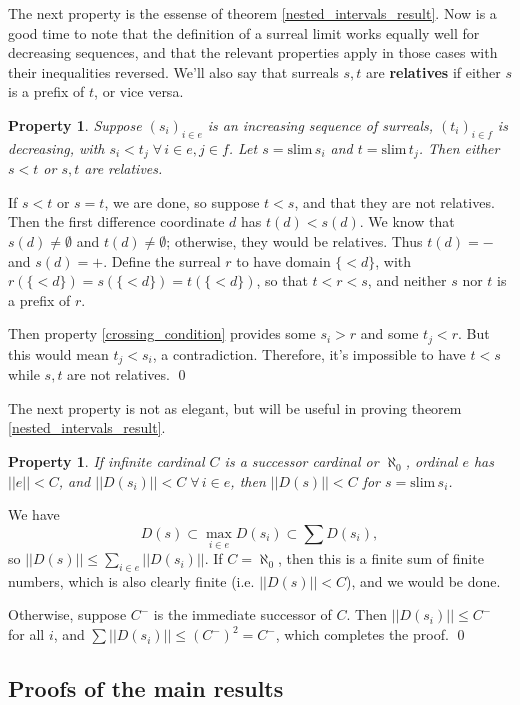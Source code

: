 \documentclass[11pt]{amsart}
\newtheorem{Prop}[Def]{Property}
\newcommand\bpf[1][]{\smallskip\noindent{\bf Proof#1.}\quad}
\newcommand\epf{\qed\medskip}
\newcommand{\slim}{\mathrm{slim}\,}
\begin{document}
The next property is the essense of theorem \ref{nested_intervals_result}.
Now is a good time to note that the definition of a surreal limit works equally
well for decreasing sequences, and that the relevant properties apply
in those cases with their inequalities reversed.  We'll also say that surreals
$s,t$ are {\bf relatives} if either $s$ is a prefix of $t$, or vice versa.

\begin{Prop}\label{sandwich_prop}
Suppose $(s_i)_{i\in e}$ is an increasing sequence of surreals,
$(t_i)_{i\in f}$ is decreasing, with $s_i < t_j \; \forall\, i\in e, j \in f$.
Let $s=\slim s_i$ and $t = \slim t_j$.
Then either $s < t$ or $s,t$ are relatives.
\end{Prop}

\bpf
If $s < t$ or $s=t$, we are done, so suppose $t < s$, and that
they are not relatives.
Then the first difference coordinate $d$ has $t(d) < s(d)$.
We know that $s(d)\ne\emptyset$ and $t(d)\ne\emptyset$;
otherwise, they would be relatives.  Thus $t(d) = -$ and
$s(d) = +$.
Define the surreal $r$ to have domain $\{< d\}$,
with $r(\{<d\}) = s(\{<d\}) = t(\{<d\})$, so that $t < r < s$,
and neither $s$ nor $t$ is a prefix of $r$.

Then property \ref{crossing_condition} provides some
$s_i > r$ and some $t_j < r$.  But this would mean
$t_j < s_i$, a contradiction.  Therefore, it's impossible
to have $t < s$ while $s,t$ are not relatives.
\epf

The next property is not as elegant, but will be useful in proving
theorem \ref{nested_intervals_result}.

\begin{Prop}\label{slim_card}
If infinite cardinal $C$ is a successor cardinal or $\aleph_0$, ordinal $e$ has $||e|| < C$, and
$||D(s_i)|| < C\; \forall \, i\in e$, then $||D(s)|| < C$ for $s = \slim s_i$.
\end{Prop}

\bpf
We have
$$ D(s) \subset \max_{i\in e} D(s_i) \subset \sum D(s_i),$$
so $||D(s)|| \le \sum_{i\in e} ||D(s_i)||$.
If $C = \aleph_0$, then this is a finite sum of finite numbers, which is
also clearly finite (i.e. $||D(s)|| < C$), and we would be done.

Otherwise, suppose $C^-$ is the immediate successor of $C$.
Then $||D(s_i)|| \le C^-$ for all $i$, and $\sum ||D(s_i)|| \le (C^-)^2 = C^-$,
which completes the proof.
\epf

\subsection{Proofs of the main results}
\end{document}
